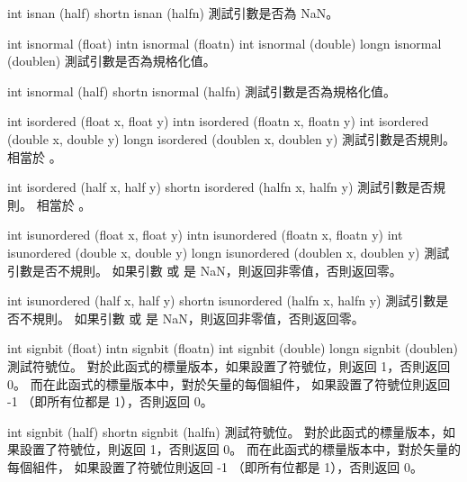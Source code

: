 int isnan (half)
shortn isnan (halfn)
\stopbuffer
{}
測試引數是否為 NaN。
\stopbuffer

int isnormal (float)
intn isnormal (floatn)
int isnormal (double)
longn isnormal (doublen)
\stopbuffer
{}
測試引數是否為規格化值。
\stopbuffer

int isnormal (half)
shortn isnormal (halfn)
\stopbuffer
{}
測試引數是否為規格化值。
\stopbuffer

int isordered (float x, float y)
intn isordered (floatn x, floatn y)
int isordered (double x, double y)
longn isordered (doublen x, doublen y)
\stopbuffer
{}
測試引數是否規則。
相當於 。
\stopbuffer

int isordered (half x, half y)
shortn isordered (halfn x, halfn y)
\stopbuffer
{}
測試引數是否規則。
相當於 。
\stopbuffer

int isunordered (float x, float y)
intn isunordered (floatn x, floatn y)
int isunordered (double x, double y)
longn isunordered (doublen x, doublen y)
\stopbuffer
{}
測試引數是否不規則。
如果引數  或  是 NaN，則返回非零值，否則返回零。
\stopbuffer

int isunordered (half x, half y)
shortn isunordered (halfn x, halfn y)
\stopbuffer
{}
測試引數是否不規則。
如果引數  或  是 NaN，則返回非零值，否則返回零。
\stopbuffer

int signbit (float)
intn signbit (floatn)
int signbit (double)
longn signbit (doublen)
\stopbuffer
{}
測試符號位。
對於此函式的標量版本，如果設置了符號位，則返回 1，否則返回 0。
而在此函式的標量版本中，對於矢量的每個組件，
如果設置了符號位則返回 -1 （即所有位都是 1），否則返回 0。
\stopbuffer

int signbit (half)
shortn signbit (halfn)
\stopbuffer
{}
測試符號位。
對於此函式的標量版本，如果設置了符號位，則返回 1，否則返回 0。
而在此函式的標量版本中，對於矢量的每個組件，
如果設置了符號位則返回 -1 （即所有位都是 1），否則返回 0。
\stopbuffer

